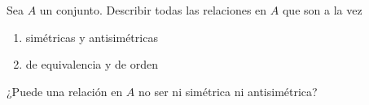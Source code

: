 \ejercicio
Sea $A$ un conjunto. Describir todas las relaciones en $A$ que son a la vez
\begin{multicols}{2}
	\begin{enumerate}[label=\roman*)]
		\item simétricas y antisimétricas\\ 
		\item de equivalencia y de orden\\ 
	\end{enumerate}
\end{multicols}

¿Puede una relación en $A$ no ser ni simétrica ni antisimétrica? \\
